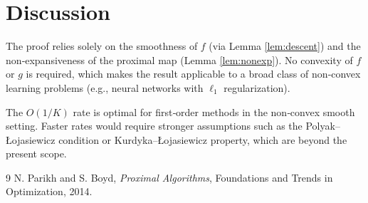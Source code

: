 \documentclass{article}
\begin{document}
\section*{Discussion}
The proof relies solely on the smoothness of $f$ (via Lemma \ref{lem:descent}) and the non‑expansiveness of the proximal map (Lemma \ref{lem:nonexp}). No convexity of $f$ or $g$ is required, which makes the result applicable to a broad class of non‑convex learning problems (e.g., neural networks with $\ell_{1}$ regularization).  

The $O(1/K)$ rate is optimal for first‑order methods in the non‑convex smooth setting. Faster rates would require stronger assumptions such as the Polyak–Łojasiewicz condition or Kurdyka–Łojasiewicz property, which are beyond the present scope.

\begin{thebibliography}{9}
N. Parikh and S. Boyd, \emph{Proximal Algorithms}, Foundations and Trends in Optimization, 2014.
\end{thebibliography}
\end{document}
